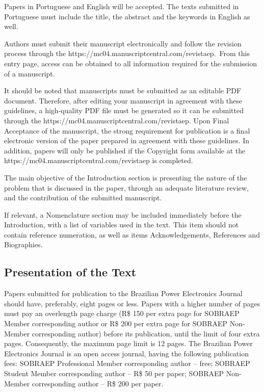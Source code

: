 \documentclass[english]{sobraep}
\begin{document}
Papers in Portuguese and English will be accepted. The texts submitted in Portuguese must include the title, the abstract and the keywords in English as well.

Authors must submit their manuscript electronically and follow the revision process through the https://mc04.manuscriptcentral.com/revistaep.~From this entry page, access can be obtained to all information required for the submission of a manuscript.

It should be noted that manuscripts must be submitted as an editable PDF document. Therefore, after editing your manuscript in agreement with these guidelines, a high-quality PDF file must be generated so it can be submitted through the https://mc04.manuscriptcentral.com/revistaep. Upon Final Acceptance of the manuscript, the strong requirement for publication is a final electronic version of the paper prepared in agreement with these guidelines. In addition, papers will only be published if the Copyright form available at the https://mc04.manuscriptcentral.com/revistaep is completed.

The main objective of the Introduction section is presenting the nature of the problem that is discussed in the paper, through an adequate literature review, and the contribution of the submitted manuscript.

If relevant, a Nomenclature section may be included immediately before the Introduction, with a list of variables used in the text. This item should not contain reference numeration, as well as items Acknowledgements, References and Biographies.

\subsection{Presentation of the Text}

Papers submitted for publication to the Brazilian Power Electronics Journal should have, preferably, eight pages or less. Papers with a higher number of pages must pay an overlength page charge (R\$ 150 per extra page for SOBRAEP Member corresponding author or R\$ 200 per extra page for SOBRAEP Non-Member corresponding author) before its publication, until the limit of four extra pages. Consequently, the maximum page limit is 12 pages.
The Brazilian Power Electronics Journal is an open access journal, having the following publication fees: SOBRAEP Professional Member corresponding author – free; SOBRAEP Student Member corresponding author – R\$ 50 per paper; SOBRAEP Non-Member corresponding author – R\$ 200 per paper.
\end{document}
